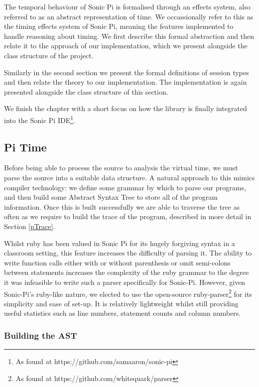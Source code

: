 \documentclass[11pt, abstracton, twoside, titlepage=true]{scrartcl}
\begin{document}
The temporal behaviour of Sonic Pi is formalised through an effects system, also 
referred to as an abstract representation of time. We occassionally refer to this 
as the timing effects system of Sonic Pi, meaning the features implemented to 
handle reasoning about timing. We first describe this formal abstraction and then 
relate it to the approach of our implementation, which we present alongside the 
class structure of the project. 

Similarly in the second section we present the formal definitions of session types 
and then relate the theory to our implementation. The implementation is again 
presented alongside the class structure of this section.

We finish the chapter with a short focus on how the library is finally integrated
into the Sonic Pi IDE\footnote{As found at https://github.com/samaaron/sonic-pi}.

\subsection{Pi Time}
Before being able to process the source to analysis the virtual time, we must parse 
the source into a suitable data structure. A 
natural approach to this mimics compiler technology: we define some
grammar by which to parse our programs, and then build some Abstract Syntax Tree 
to store all of the program information. Once this 
is built successfully we are able to traverse the tree as often as we require 
to build the trace of the program, described in more detail in Section \ref{pTrace}.

Whilst ruby has been valued in Sonic Pi for its hugely forgiving
syntax in a classroom setting, this feature increases the difficulty of parsing 
it. The ability to write function calls either with or without parenthesis 
or omit semi-colons between statements increases the complexity of the ruby 
grammar to the degree it was infeasible to write such a parser specifically 
for Sonic-Pi. However, given Sonic-Pi's ruby-like nature, we elected to use 
the open-source ruby-parser\footnote{As found at https://github.com/whitequark/parser}
for its simplicity and ease of set-up. It is relatively lightweight whilst 
still providing useful statistics such as line numbers, statement counts and
column numbers. 
\newpage

\subsubsection{Building the AST} \label{build}
\end{document}
